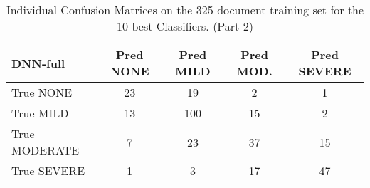 {\begin{table}
\begin{tabular}{|l|c|c|c|c|}
   \hline
   \cellcolor{gray!15} \textsf{DNN-full} & \textsf{Pred NONE} & \textsf{Pred MILD} & \textsf{Pred MOD.} & \textsf{Pred SEVERE} \\
   \hline
   \textsf{True NONE} & \cellcolor{gray!15} 23 & 19 & 2 & 1 \\
   \textsf{True MILD} & 13 & \cellcolor{gray!15} 100 & 15 & 2 \\
   \textsf{True MODERATE} & 7 & 23 & \cellcolor{gray!15} 37 & 15 \\
   \textsf{True SEVERE} & 1 & 3 & 17 & \cellcolor{gray!15} 47 \\
   \hline
    \end{tabular}
    \caption{Individual Confusion Matrices on the 325 document training set for the 10 best Classifiers. (Part 2)}
    \label{tab:BestEnsembleClassifiersConfusionMatrix2}
\end{table}} \quad


